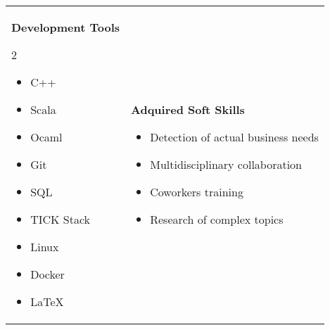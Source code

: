 \documentclass[12pt, letterpaper]{article}
\renewcommand{\large}{\fontsize{14}{20}\selectfont}
\begin{document}
\begin{tabular}[t]{ l l }
		\parbox[t]{0.5\linewidth}{
			{\large \color{base-color} \textbf{Development Tools}}
			\begin{multicols}{2}
				\begin{itemize}[leftmargin=*]
					\setlength\itemsep{0.05em}
					\item[] C++
					\item[] Scala
					\item[] Ocaml
					\item[] Git
					\item[] SQL
					\item[] TICK Stack
					\item[] Linux
					\item[] Docker
					\item[] \LaTeX
				\end{itemize}
			\end{multicols}
		}&
		\parbox[t][][t]{0.5\textwidth}{
			{\large \color{base-color} \textbf{Adquired Soft Skills}}
			\begin{itemize}[leftmargin=*]
				\setlength\itemsep{0.05em}
				\item[] Detection of actual business needs
				\item[] Multidisciplinary collaboration
				\item[] Coworkers training
				\item[] Research of complex topics
			\end{itemize}
		}
	\end{tabular}
\end{document}
